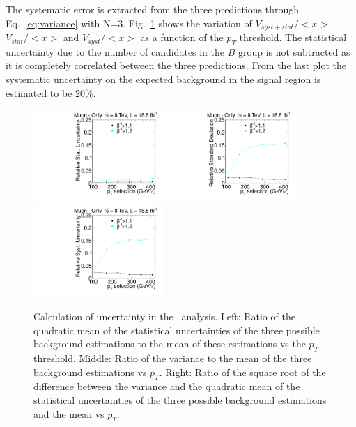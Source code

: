 The systematic error is extracted from the three predictions
through Eq.~\ref{eq:variance} with N=3.
Fig.~\ref{fig:MuOnlyUnc} shows the variation of
$V_{syst+stat}/<x>$, $V_{stat}/<x>$ and $V_{syst}/<x>$
as a function of the $p_T$ threshold. The statistical uncertainty due to the number of candidates in the $B$ group is not subtracted as it is completely correlated
between the three predictions. From the last plot
the systematic uncertainty on the expected background in the signal
region is estimated to be 20\%.

\begin{figure}
\begin{center}
\includegraphics[clip=true, trim=0.0cm 0cm 3.0cm 0cm,width=0.44\textwidth]{figures/muonly/Data8TeVCollisionStat}
\includegraphics[clip=true, trim=0.0cm 0cm 3.0cm 0cm,width=0.44\textwidth]{figures/muonly/Data8TeVCollisionStatSyst} \\
\includegraphics[clip=true, trim=0.0cm 0cm 3.0cm 0cm,width=0.44\textwidth]{figures/muonly/Data8TeVCollisionSyst}
\caption[Statistical and systematic uncertainties in the background prediction for different sets of thresholds in the \muononly\ analysis.]
{Calculation of uncertainty in the \muononly\ analysis.
Left: Ratio of the quadratic
mean of the statistical uncertainties of the three possible background
estimations to the mean of these estimations vs
the $p_T$ threshold. Middle: Ratio of the variance to the mean of the three
background estimations vs $p_T$. Right: Ratio of the
square root of the difference between the variance and the quadratic
mean of the statistical uncertainties  of the three possible background
estimations and the mean vs $p_T$.
}
\label{fig:MuOnlyUnc}
\end{center}
\end{figure}

